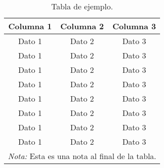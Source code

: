 \begin{table}[!ht]
  \caption{Tabla de ejemplo.}
  \centering
  \begin{tabular}{ccc}
    \toprule
    \textbf{Columna 1} & \textbf{Columna 2} & \textbf{Columna 3}\\
    \midrule
    Dato 1             & Dato 2             & Dato 3            \\
    Dato 1             & Dato 2             & Dato 3            \\
    Dato 1             & Dato 2             & Dato 3            \\
    Dato 1             & Dato 2             & Dato 3            \\
    Dato 1             & Dato 2             & Dato 3            \\
    Dato 1             & Dato 2             & Dato 3            \\
    Dato 1             & Dato 2             & Dato 3            \\
    Dato 1             & Dato 2             & Dato 3            \\
    \bottomrule
    \multicolumn{3}{c}{\emph{Nota:} Esta es una nota al final de la tabla.}
  \end{tabular}
  \label{tab:ejemplo1}

\end{table}
